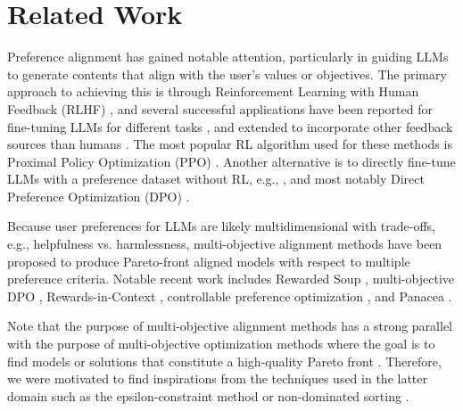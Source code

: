 \section{Related Work}
Preference alignment has gained notable attention, particularly in guiding LLMs to generate contents that align with the user's values or objectives. The primary approach to achieving this is through Reinforcement Learning with Human Feedback (RLHF) \cite{christiano2017deep}, and several successful applications have been reported for fine-tuning LLMs for different tasks \cite{ziegler2019fine, stiennon2020learning, ouyang2022training}, and extended to incorporate other feedback sources than humans \cite{leerlaif, liu2023rltf, jha2024rlsf, williams2024multi}. The most popular RL algorithm used for these methods is Proximal Policy Optimization (PPO) \cite{schulman2017proximal}. Another alternative is to directly fine-tune LLMs with a preference dataset without RL, e.g., \cite{hejna2023contrastive, azar2024general, ethayarajh2024kto}, and most notably Direct Preference Optimization (DPO) \cite{rafailov2024direct}. 

Because user preferences for LLMs are likely multidimensional with trade-offs, e.g., helpfulness vs. harmlessness, multi-objective alignment methods have been proposed to produce Pareto-front aligned models with respect to multiple preference criteria. Notable recent work includes Rewarded Soup \cite{rame2024rewarded}, multi-objective DPO \cite{zhou2024beyond}, Rewards-in-Context \cite{yang2024rewards}, controllable preference optimization \cite{guo2024controllable}, and Panacea \cite{zhong2024panacea}.

Note that the purpose of multi-objective alignment methods has a strong parallel with the purpose of multi-objective optimization methods \cite{deb2016multi} where the goal is to find models or solutions that constitute a high-quality Pareto front \cite{zitzler1998multiobjective}. Therefore, we were motivated to find inspirations from the techniques used in the latter domain such as the epsilon-constraint method \cite{haimes1971bicriterion} or non-dominated sorting \cite{deb2002fast}.